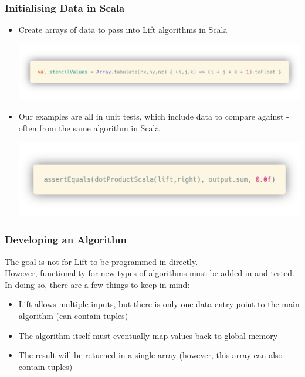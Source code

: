 \documentclass[10pt,usetotalslideindicator]{beamer}
\begin{document}
\begin{frame}
\frametitle{Initialising Data in Scala}
\begin{itemize}
    \item Create arrays of data to pass into Lift algorithms in Scala 
        \vspace{-.5cm}
\begin{block}{}
    \begin{center}
         \includegraphics[width=.85\textwidth]{../images/scalaArrays.png}
    \end{center}
\end{block}
    \item Our examples are all in unit tests, which include data to compare against - often from the same algorithm in Scala 
        \vspace{-.5cm}
    \begin{block}{}
        \begin{center}
            \includegraphics[width=.8\textwidth]{../images/unitTestData.png}
        \end{center}
    \end{block}
\end{itemize}
\end{frame}

\begin{frame}
\frametitle{Developing an Algorithm}
The goal is not for Lift to be programmed in directly.\\
\vspace{.1cm}
However, functionality for new types of algorithms must be added in and tested. In doing so, there are a few things to keep in mind: 
\begin{itemize}
    \item Lift allows multiple inputs, but there is only one data entry point to the main algorithm (can contain tuples)
    \item The algorithm itself must eventually map values back to global memory
    \item The result will be returned in a single array (however, this array can also contain tuples)
\end{itemize}
\end{frame}
\end{document}
